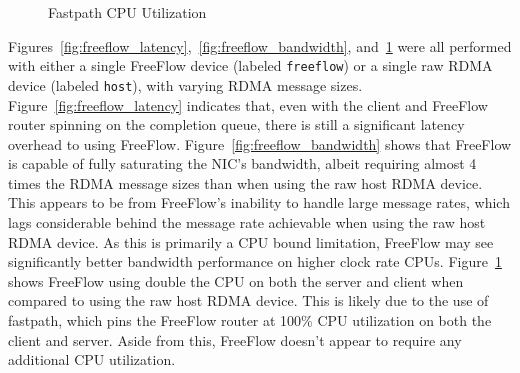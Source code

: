 \documentclass[12pt,titlepage]{article}
\begin{document}
\begin{figure}
	\centering
	\caption{Fastpath CPU Utilization}%
	\label{fig:freeflow_cpu}
\end{figure}

Figures~\ref{fig:freeflow_latency},~\ref{fig:freeflow_bandwidth}, and~\ref{fig:freeflow_cpu} were all performed with either a single FreeFlow device (labeled \texttt{freeflow}) or a single raw RDMA device (labeled \texttt{host}), with varying RDMA message sizes.
Figure~\ref{fig:freeflow_latency} indicates that, even with the client and FreeFlow router spinning on the completion queue, there is still a significant latency overhead to using FreeFlow.
Figure~\ref{fig:freeflow_bandwidth} shows that FreeFlow is capable of fully saturating the NIC's bandwidth, albeit requiring almost 4 times the RDMA message sizes than when using the raw host RDMA device.
This appears to be from FreeFlow's inability to handle large message rates, which lags considerable behind the message rate achievable when using the raw host RDMA device.
As this is primarily a CPU bound limitation, FreeFlow may see significantly better bandwidth performance on higher clock rate CPUs.
Figure~\ref{fig:freeflow_cpu} shows FreeFlow using double the CPU on both the server and client when compared to using the raw host RDMA device.
This is likely due to the use of fastpath, which pins the FreeFlow router at 100\% CPU utilization on both the client and server. 
Aside from this, FreeFlow doesn't appear to require any additional CPU utilization.
\end{document}
